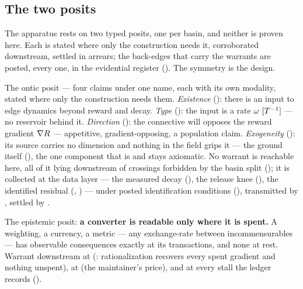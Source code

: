 \documentclass[../main]{subfiles}
\begin{document}
\subsection{The two posits}
\label{subsec:gen:posits}
%
The apparatus rests on two typed posits, one per basin, and neither is proven here. Each
is stated where only the construction needs it, corroborated downstream, settled in
arrears; the back-edges that carry the warrants are posted, every one, in the evidential
register (). The symmetry is the design.

\begin{postulate}
  The ontic posit --- four claims under one name, each with its own modality, stated
  where only the construction needs them. \emph{Existence} 
  (): there is
  an input to edge dynamics beyond reward and decay. \emph{Type} 
  ():
  the input is a rate $\omega\ [T\sp{-1}]$ --- no reservoir behind it. \emph{Direction}
  (): the connective will opposes the reward gradient
  $\nabla R$ --- appetitive, gradient-opposing, a population claim.
  \emph{Exogeneity} (): its source carries no dimension and nothing in
  the field grips it --- the ground itself (), the one component that is
  and stays axiomatic. No warrant is reachable here, all of it lying downstream of
  crossings forbidden by the basin split (); it is collected at the
  data layer --- the measured decay (), the release knee
  (), the identified residual (,
  ) --- under posted
  identification conditions (), transmitted by ,
  settled by .
\end{postulate}

\begin{postulate}
  The epistemic posit: \textbf{a converter is readable only where it is spent.} A
  weighting, a currency, a metric --- any exchange-rate between incommensurables --- has
  observable consequences exactly at its transactions, and none at rest. Warrant
  downstream at  (: rationalization recovers every
  spent gradient and nothing unspent), at  (the maintainer's price), and at
  every stall the ledger records ().
\end{postulate}
\end{document}
